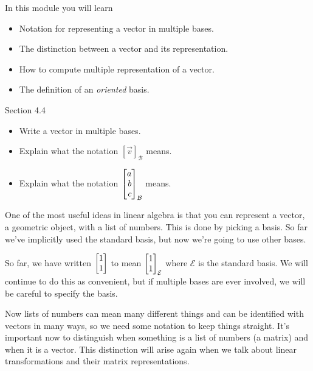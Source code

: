 \documentclass{problemset}
\newcommand{\bookonlynewpage}{\begin{bookonly}\newpage\end{bookonly}}
\begin{document}
\begin{module}

	In this module you will learn
	\begin{itemize}
		\item Notation for representing a vector in multiple bases.
		\item The distinction between a vector and its representation.
		\item How to compute multiple representation of a vector.
		\item The definition of an \emph{oriented} basis.
	\end{itemize}

	
\end{module}
\begin{lesson}

	Section 4.4

	\begin{itemize}
		\item Write a vector in multiple bases.
		\item Explain what the notation $[\vec v]_{\mathcal B}$ means.
		\item Explain what the notation $\mat{a\\b\\c}_{\mathcal B}$ means.
	\end{itemize}

	One of the most useful ideas in linear algebra is that you can
	represent a vector, a geometric object, with a list of numbers. This
	is done by picking a basis. So far we've implicitly used the standard basis,
	but now we're going to use other bases.

	\begin{annotation}
		\begin{notes}
			So far, we have written $\mat{1\\1}$ to mean
			$\mat{1\\1}_{\mathcal E}$ where $\mathcal E$ is the
			standard basis. We will continue to do this as convenient,
			but if multiple bases are ever involved, we will be careful
			to specify the basis.
		\end{notes}
	\end{annotation}
	Now lists of numbers can mean many different things and can be identified
	with vectors in many ways, so we need some notation to keep things straight.
	It's important now to distinguish when something is a list of numbers (a matrix)
	and when it is a vector. This distinction will arise again when
	we talk about linear transformations and their matrix representations.

\end{lesson}
	\bookonlynewpage
\end{document}
